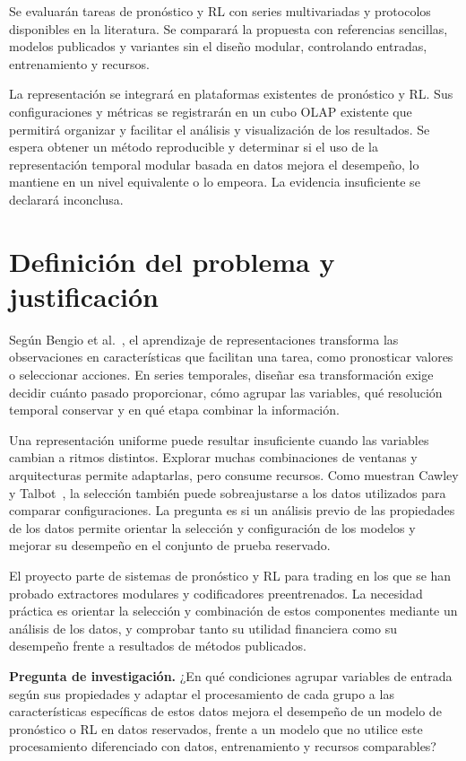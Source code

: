 \documentclass[11pt,letterpaper]{article}
\begin{document}
Se evaluarán tareas de pronóstico y RL con series multivariadas y protocolos disponibles en la literatura. Se comparará la propuesta con referencias sencillas, modelos publicados y variantes sin el diseño modular, controlando entradas, entrenamiento y recursos.

La representación se integrará en plataformas existentes de pronóstico y RL. Sus configuraciones y métricas se registrarán en un cubo OLAP existente que permitirá organizar y facilitar el análisis y visualización de los resultados. Se espera obtener un método reproducible y determinar si el uso de la representación temporal modular basada en datos mejora el desempeño, lo mantiene en un nivel equivalente o lo empeora. La evidencia insuficiente se declarará inconclusa.

\section{Definición del problema y justificación}

Según Bengio et al.~\cite{bengio2013representation}, el aprendizaje de representaciones transforma las observaciones en características que facilitan una tarea, como pronosticar valores o seleccionar acciones. En series temporales, diseñar esa transformación exige decidir cuánto pasado proporcionar, cómo agrupar las variables, qué resolución temporal conservar y en qué etapa combinar la información. 

Una representación uniforme puede resultar insuficiente cuando las variables cambian a ritmos distintos. Explorar muchas combinaciones de ventanas y arquitecturas permite adaptarlas, pero consume recursos. Como muestran Cawley y Talbot~\cite{cawley2010overfit}, la selección también puede sobreajustarse a los datos utilizados para comparar configuraciones. La pregunta es si un análisis previo de las propiedades de los datos permite orientar la selección y configuración de los modelos y mejorar su desempeño en el conjunto de prueba reservado.

El proyecto parte de sistemas de pronóstico y RL para trading en los que se han probado extractores modulares y codificadores preentrenados. La necesidad práctica es orientar la selección y combinación de estos componentes mediante un análisis de los datos, y comprobar tanto su utilidad financiera como su desempeño frente a resultados de métodos publicados.

\begin{tcolorbox}[colback=soft,colframe=sabana,boxrule=0.6pt,arc=1.2pt,left=6pt,right=6pt,top=5pt,bottom=5pt]
\textbf{Pregunta de investigación.}
¿En qué condiciones agrupar variables de entrada según sus propiedades y adaptar el procesamiento de cada grupo a las características específicas de estos datos mejora el desempeño de un modelo de pronóstico o RL en datos reservados, frente a un modelo que no utilice este procesamiento diferenciado con datos, entrenamiento y recursos comparables?
\end{tcolorbox}
\end{document}
